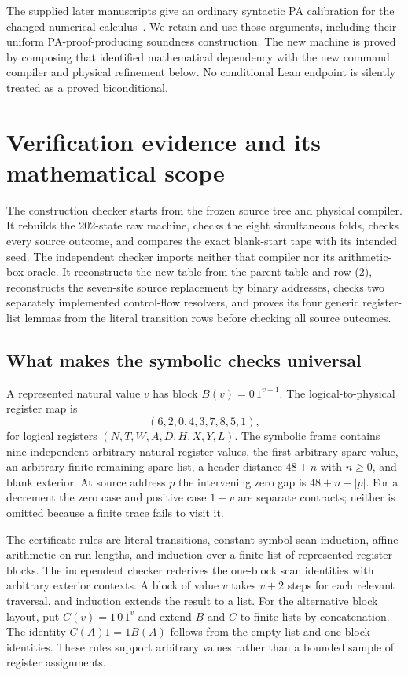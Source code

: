 \documentclass[11pt,letterpaper]{article}
\begin{document}
The supplied later manuscripts give an ordinary syntactic PA calibration
for the changed numerical calculus~\cite{primary,calibration,chang}. We retain and use those arguments,
including their uniform PA-proof-producing soundness construction.
The new machine is proved by composing that identified mathematical
dependency with the new command compiler and physical refinement below.
No conditional Lean endpoint is silently treated as a proved biconditional.



\section{Verification evidence and its mathematical scope}
\label{sec:verification}



The construction checker starts from the frozen source tree and physical
compiler. It rebuilds the 202-state raw machine, checks the eight
simultaneous folds, checks every source outcome, and compares the exact
blank-start tape with its intended seed. The independent checker imports
neither that compiler nor its arithmetic-box oracle. It reconstructs the
new table from the parent table and row (2), reconstructs the seven-site
source replacement by binary addresses, checks two separately implemented
control-flow resolvers, and proves its four generic register-list lemmas
from the literal transition rows before checking all source outcomes.

\subsection{What makes the symbolic checks universal}

A represented natural value $v$ has block $B(v)=0\,1^{v+1}$.
The logical-to-physical register map is
\[
                    (6,2,0,4,3,7,8,5,1),
\]
for logical registers $(N,T,W,A,D,H,X,Y,L)$.
The symbolic frame contains nine independent arbitrary natural register
values, the first arbitrary spare value, an arbitrary finite remaining
spare list, a header distance $48+n$ with $n\ge0$, and blank exterior.
At source address $p$ the intervening zero gap is $48+n-|p|$.
For a decrement the zero case and positive case $1+v$ are separate
contracts; neither is omitted because a finite trace fails to visit it.

The certificate rules are literal transitions, constant-symbol scan
induction, affine arithmetic on run lengths, and induction over a finite
list of represented register blocks. The independent checker rederives
the one-block scan identities with arbitrary exterior contexts. A block
of value $v$ takes $v+2$ steps for each relevant traversal, and induction
extends the result to a list. For the alternative block layout, put
$C(v)=1\,0\,1^v$ and extend $B$ and $C$ to finite lists by concatenation.
The identity $C(A)1=1B(A)$ follows from the empty-list and one-block identities.
These rules support arbitrary values rather than a bounded sample of
register assignments.
\end{document}
